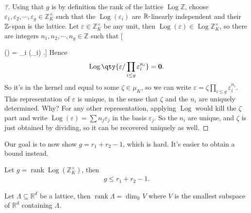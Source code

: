 \begin{proof}[?]

Using that \(g\) is by definition the rank of the lattice
\(\operatorname{Log}{\mathbb{Z}}\), choose
\({ {\varepsilon}_1, {\varepsilon}_2, \cdots, {\varepsilon}_{g}}\in {\mathbb{Z}}_K^{\times}\)
such that the \(\operatorname{Log}(\varepsilon_i)\) are
\({\mathbb{R}}{\hbox{-}}\)linearly independent and their
\({\mathbb{Z}}{\hbox{-}}\)span is the lattice. Let
\(\varepsilon\in {\mathbb{Z}}_K^{\times}\) be any unit, then
\(\operatorname{Log}(\varepsilon) \in \operatorname{Log}{\mathbb{Z}}_K^{\times}\),
so there are integers
\({ {n}_1, {n}_2, \cdots, {n}_{g}}\in {\mathbb{Z}}\) such that {[}

(\varepsilon) = \sumn\_i
(\varepsilon\_i) .{]} Hence
\begin{align*}
\operatorname{Log}\qty{ \varepsilon/ \prod_{i\leq g} \varepsilon_i^{n_i} } = \mathbf{0}
.\end{align*}
So it's in the kernel and equal to some \(\zeta\in \mu_K\), so we can
write \(\varepsilon= \zeta \prod_{i\leq g} \varepsilon_i^{n_i}\). This
representation of \(\varepsilon\) is unique, in the sense that \(\zeta\)
and the \(n_i\) are uniquely determined. Why? For any other
representation, applying \(\operatorname{Log}\) would kill the \(\zeta\)
part and write
\(\operatorname{Log}(\varepsilon) = \sum n_{j} \varepsilon_j\) in the
basis \(\varepsilon_j\). So the \(n_i\) are unique, and \(\zeta\) is
just obtained by dividing, so it can be recovered uniquely as well.

\end{proof}

\begin{remark}

Our goal is to now show \(g=r_1 + r_2-1\), which is hard. It's easier to
obtain a bound instead.

\end{remark}

\begin{proposition}

Let
\(g = \operatorname{rank}\operatorname{Log}({\mathbb{Z}}_K^{\times})\),
then
\begin{align*}
g\leq r_1 + r_2 - 1
.\end{align*}

\end{proposition}

\begin{lemma}[?]

Let \(\Lambda \subseteq {\mathbb{R}}^d\) be a lattice, then
\(\operatorname{rank}\Lambda = \dim_{\mathbb{R}}V\) where \(V\) is the
smallest subspace of \({\mathbb{R}}^d\) containing \(\Lambda\).

\end{lemma}


